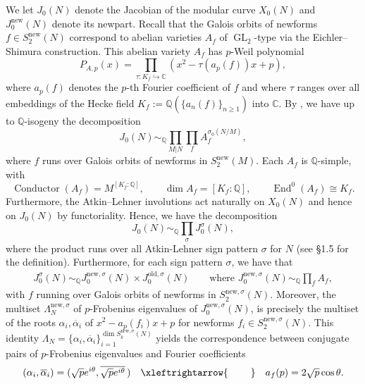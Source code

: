\documentclass[11pt,letterpaper,reqno]{amsart}
\theoremstyle{definition}
\numberwithin{equation}{section}
\numberwithin{figure}{section}
\numberwithin{table}{section}
\newcommand{\nw}{\mathrm{new}}
\begin{document}
We let $J_0(N)$ denote the Jacobian of the modular curve $X_0(N)$ and $J_0^{\mathrm{new}}(N)$ denote its newpart.
Recall that the Galois orbits of newforms $f \in S_2^{\mathrm{new}}(N)$ correspond to abelian varieties $A_f$ of $\operatorname{GL}_2$-type via the Eichler--Shimura construction. This abelian variety $A_f$ has $p$-Weil polynomial
\[
P_{A,p}(x)=\prod_{\tau : K_f \hookrightarrow \mathbb{C}} \left(x^2 - \tau(a_p(f))x + p\right),
\]
where $a_p(f)$ denotes the $p$-th Fourier coefficient of $f$ and where $\tau$ ranges over all embeddings of the Hecke field $K_f := \mathbb{Q}(\{a_n(f)\}_{n \geq 1})$ into $\mathbb{C}$. By \cite[Page 1]{MurtySinhaDecomp}, we have up to $\mathbb{Q}$-isogeny the decomposition
$$J_0(N) \sim_{\mathbb{Q}} \prod_{M | N} \prod_{f} A_f^{\sigma_0(N/M)},$$
where $f$ runs over Galois orbits of newforms in $S_2^{\mathrm{new}}(M)$. Each $A_f$ is $\mathbb{Q}$-simple, with
\[
\operatorname{Conductor}(A_f) = M^{[K_f : \mathbb{Q}]}, \qquad \dim A_f = [K_f : \mathbb{Q}], \qquad \operatorname{End}^0(A_f) \cong K_f.
\]Furthermore, the Atkin--Lehner involutions act naturally on $X_0(N)$ and hence on $J_0(N)$ by functoriality. Hence, we have the decomposition
\[
J_0(N) \sim_{\mathbb{Q}} \prod_{\sigma} J_0^{\sigma}(N),
\]
where the product runs over all Atkin-Lehner sign pattern $\sigma$ for $N$ (see \S1.5 for the definition). Furthermore, for each sign pattern $\sigma$, we have that 
\begin{align}
    J_0^{\sigma}(N) \sim_{\mathbb{Q}} J_0^{\nw, \sigma}(N) \times J_0^{\text{old}, \sigma}(N) \qquad \text{where $J_0^{\nw, \sigma}(N) \sim_{\mathbb{Q}} \prod_{f} A_f,$}
\end{align}
with $f$ running over Galois orbits of newforms in $S_2^{\nw, \sigma}(N)$. Moreover, the multiset $\Lambda_N^{\nw, \sigma}$ of $p$-Frobenius eigenvalues of $J_0^{\nw, \sigma}(N)$, is precisely the multiset of the roots $\alpha_i,\overline \alpha_i$ of $x^2 - a_p(f_i) x + p$ for newforms $f_i \in S_2^{\nw, \sigma}(N)$. This identity $\Lambda_N =\{\alpha_i, \overline{\alpha}_i\}_{i=1}^{\dim S_k^{\nw,\sigma}(N)}$
yields the correspondence between conjugate pairs of $p$-Frobenius eigenvalues and Fourier coefficients
\begin{align}
    \label{eqn:correspondence_conpair-pFrob-eig_and_four-coeff}
    (\alpha_i, \overline \alpha_i) = (\sqrt p e^{i\theta}, \overline{\sqrt p e^{i\theta}}\, ) 
    \quad
    \xleftrightarrow{\hspace{8mm}} 
    \quad
    a_f(p) = 2 \sqrt p \cos \theta.
\end{align}
\end{document}
